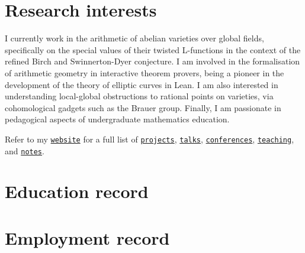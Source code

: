 \documentclass[10pt]{moderncv}
\begin{document}
\makecvtitle

\section{Research interests}

I currently work in the arithmetic of abelian varieties over global fields, specifically on the special values of their twisted L-functions in the context of the refined Birch and Swinnerton-Dyer conjecture. I am involved in the formalisation of arithmetic geometry in interactive theorem provers, being a pioneer in the development of the theory of elliptic curves in Lean. I am also interested in understanding local-global obstructions to rational points on varieties, via cohomological gadgets such as the Brauer group. Finally, I am passionate in pedagogical aspects of undergraduate mathematics education.

\vspace{0.5cm}

Refer to my \href{https://multramate.github.io}{\texttt{website}} for a full list of \href{https://multramate.github.io/projects/}{\texttt{projects}}, \href{https://multramate.github.io/talks/}{\texttt{talks}}, \href{https://multramate.github.io/conferences/}{\texttt{conferences}}, \href{https://multramate.github.io/teaching/}{\texttt{teaching}}, and \href{https://multramate.github.io/notes/}{\texttt{notes}}.

\section{Education record}

\vspace{-0.1cm}

\section{Employment record}

\vspace{-0.1cm}
\vspace{-0.1cm}
\end{document}
